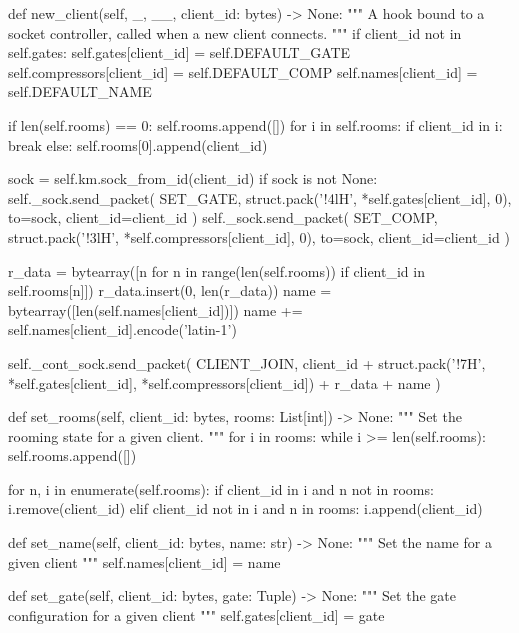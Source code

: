\begin{pythoncode}
    def new_client(self, _, __, client_id: bytes) -> None:
        """
        A hook bound to a socket controller, called when a new client connects.
        """
        if client_id not in self.gates:
            self.gates[client_id] = self.DEFAULT_GATE
            self.compressors[client_id] = self.DEFAULT_COMP
            self.names[client_id] = self.DEFAULT_NAME

        if len(self.rooms) == 0:
            self.rooms.append([])
        for i in self.rooms:
            if client_id in i:
                break
        else:
            self.rooms[0].append(client_id)

        sock = self.km.sock_from_id(client_id)
        if sock is not None:
            self._sock.send_packet(
                SET_GATE,
                struct.pack('!4lH', *self.gates[client_id], 0),
                to=sock,
                client_id=client_id
            )
            self._sock.send_packet(
                SET_COMP,
                struct.pack('!3lH', *self.compressors[client_id], 0),
                to=sock,
                client_id=client_id
            )

        r_data = bytearray([n for n in range(len(self.rooms)) if client_id in self.rooms[n]])
        r_data.insert(0, len(r_data))
        name = bytearray([len(self.names[client_id])])
        name += self.names[client_id].encode('latin-1')

        self._cont_sock.send_packet(
            CLIENT_JOIN,
            client_id + struct.pack('!7H', *self.gates[client_id],
                                    *self.compressors[client_id])
                      + r_data + name
        )

    def set_rooms(self, client_id: bytes, rooms: List[int]) -> None:
        """
        Set the rooming state for a given client.
        """
        for i in rooms:
            while i >= len(self.rooms):
                self.rooms.append([])

        for n, i in enumerate(self.rooms):
            if client_id in i and n not in rooms:
                i.remove(client_id)
            elif client_id not in i and n in rooms:
                i.append(client_id)

    def set_name(self, client_id: bytes, name: str) -> None:
        """
        Set the name for a given client
        """
        self.names[client_id] = name

    def set_gate(self, client_id: bytes, gate: Tuple) -> None:
        """
        Set the gate configuration for a given client
        """
        self.gates[client_id] = gate


\end{pythoncode}
